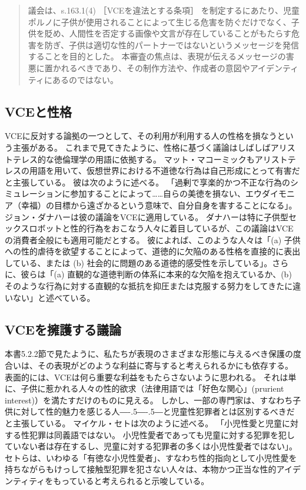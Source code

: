 \documentclass[paper=a4,book,openany]{jlreq}
\def\DDASH{―\kern-.5\zw―\kern-.5\zw―} %
\begin{document}
\begin{quote}
議会は、s.163.1(4) ［VCEを違法とする条項］ を制定するにあたり、児童ポルノに子供が使用されることによって生じる危害を防ぐだけでなく、子供を貶め、人間性を否定する画像や文言が存在していることがもたらす危害を防ぎ、子供は適切な性的パートナーではないというメッセージを発信することを目的とした。
本審査の焦点は、表現が伝えるメッセージの害悪に置かれるべきであり、その制作方法や、作成者の意図やアイデンティティにあるのではない。
\end{quote}

\subsection{VCEと性格}

VCEに反対する論拠の一つとして、その利用が利用する人の性格を損なうという主張がある。
これまで見てきたように、性格に基づく議論はしばしばアリストテレス的な徳倫理学の用語に依拠する。
マット・マコーミックもアリストテレスの用語を用いて、仮想世界における不道徳な行為は自己形成にとって有害だと主張している。
彼は次のように述べる。
「過剰で享楽的かつ不正な行為のシミュレーションに参加することによって……自らの美徳を損ない、エウダイモニア（幸福）の目標から遠ざかるという意味で、自分自身を害することになる」\citep[p.278]{mccormick01:_is_it_wrong_play_violen_video_games}。
ジョン・ダナハーは彼の議論をVCEに適用している。
ダナハーは特に子供型セックスロボットと性的行為をおこなう人々に着目しているが、この議論はVCEの消費者全般にも適用可能だとする。
彼によれば、このような人々は「(a) 子供への性的虐待を欲望することによって、道徳的に欠陥のある性格を直接的に表出している、または (b) 社会的に問題のある道徳的感受性を示している」。さらに、彼らは「(a) 直観的な道徳判断の体系に本来的な欠陥を抱えているか、(b) そのような行為に対する直観的な抵抗を抑圧または克服する努力をしてきたに違いない」と述べている\citep[p.86]{danaher17:_robot_rape_robot_child_sexual_abuse}。

\subsection{VCEを擁護する議論}

本書5.2.2節で見たように、私たちが表現のさまざまな形態に与えるべき保護の度合いは、その表現がどのような利益に寄与すると考えられるかにも依存する。
表面的には、VCEは何ら重要な利益をもたらさないように思われる。
それは単に、子供に惹かれる人々の性的欲求（法律用語では「好色な関心」(prurient interest)）を満たすだけのものに見える。
しかし、一部の専門家は、\ruby{小児性愛者}{ペドファイル}{\DDASH}すなわち子供に対して性的魅力を感じる人{\DDASH}と児童性犯罪者とは区別するべきだと主張している。
マイケル・セトは次のように述べる。
「小児性愛と児童に対する性犯罪は同義語ではない。
小児性愛者であっても児童に対する犯罪を犯していない者は存在するし、児童に対する犯罪者の多くは小児性愛者ではない」\citep{apabooks18:_michael_c}。
セトらは、いわゆる「有徳な小児性愛者」、すなわち性的指向として小児性愛を持ちながらもけっして接触型犯罪を犯さない人々は、本物かつ正当な性的アイデンティティをもっていると考えられると示唆している\citep{seto12:_is_pedop_sexual_orien}。
\end{document}
